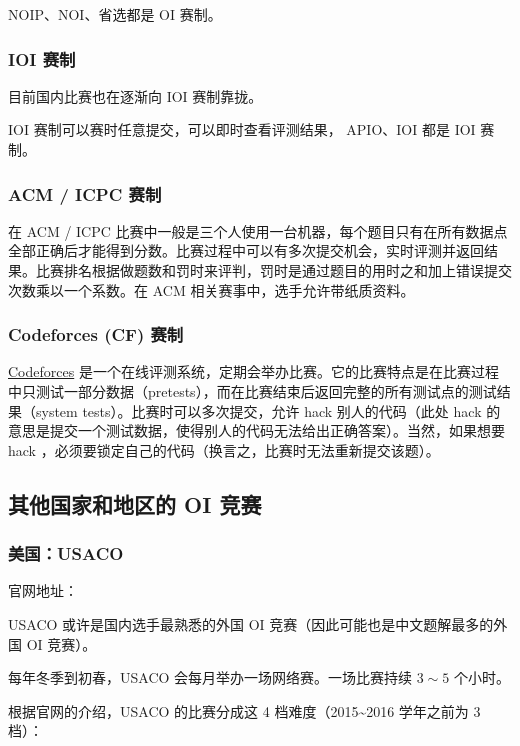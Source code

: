NOIP、NOI、省选都是 OI 赛制。

\subsubsection{IOI 赛制}

目前国内比赛也在逐渐向 IOI 赛制靠拢。

IOI 赛制可以赛时任意提交，可以即时查看评测结果， APIO、IOI 都是 IOI 赛制。

\subsubsection{ACM / ICPC 赛制}

在 ACM / ICPC 比赛中一般是三个人使用一台机器，每个题目只有在所有数据点全部正确后才能得到分数。比赛过程中可以有多次提交机会，实时评测并返回结果。比赛排名根据做题数和罚时来评判，罚时是通过题目的用时之和加上错误提交次数乘以一个系数。在 ACM 相关赛事中，选手允许带纸质资料。

\subsubsection{Codeforces (CF) 赛制}

\href{https://codeforces.com}{Codeforces} 是一个在线评测系统，定期会举办比赛。它的比赛特点是在比赛过程中只测试一部分数据（pretests），而在比赛结束后返回完整的所有测试点的测试结果（system tests）。比赛时可以多次提交，允许 hack 别人的代码（此处 hack 的意思是提交一个测试数据，使得别人的代码无法给出正确答案）。当然，如果想要 hack ，必须要锁定自己的代码（换言之，比赛时无法重新提交该题）。

\subsection{其他国家和地区的 OI 竞赛}

\subsubsection{美国：USACO}

官网地址：\href{https://www.usaco.org/}{}

USACO 或许是国内选手最熟悉的外国 OI 竞赛（因此可能也是中文题解最多的外国 OI 竞赛）。  

每年冬季到初春，USACO 会每月举办一场网络赛。一场比赛持续 $3\sim5$ 个小时。  

根据官网的介绍，USACO 的比赛分成这 4 档难度（2015\textasciitilde{}2016 学年之前为 3 档）：


